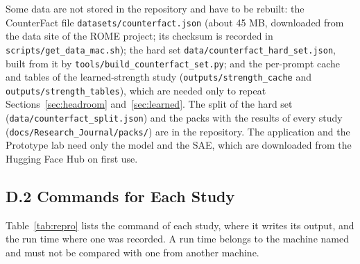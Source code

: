\documentclass[12pt,a4paper]{report}
\begin{document}
Some data are not stored in the repository and have to be rebuilt: the CounterFact file \texttt{datasets/\allowbreak{}counterfact.\allowbreak{}json} (about 45 MB, downloaded from the data site of the ROME project; its checksum is recorded in \texttt{scripts/\allowbreak{}get\_\allowbreak{}data\_\allowbreak{}mac.\allowbreak{}sh}); the hard set \texttt{data/\allowbreak{}counterfact\_\allowbreak{}hard\_\allowbreak{}set.\allowbreak{}json}, built from it by \texttt{tools/\allowbreak{}build\_\allowbreak{}counterfact\_\allowbreak{}set.\allowbreak{}py}; and the per-prompt cache and tables of the learned-strength study (\texttt{outputs/\allowbreak{}strength\_\allowbreak{}cache} and \texttt{outputs/\allowbreak{}strength\_\allowbreak{}tables}), which are needed only to repeat Sections~\ref{sec:headroom} and~\ref{sec:learned}. The split of the hard set (\texttt{data/\allowbreak{}counterfact\_\allowbreak{}split.\allowbreak{}json}) and the packs with the results of every study (\texttt{docs/\allowbreak{}Research\_\allowbreak{}Journal/\allowbreak{}packs/\allowbreak{}}) are in the repository. The application and the Prototype lab need only the model and the SAE, which are downloaded from the Hugging Face Hub on first use.

\subsection*{D.2 Commands for Each Study}
Table~\ref{tab:repro} lists the command of each study, where it writes its output, and the run time where one was recorded. A run time belongs to the machine named and must not be compared with one from another machine.
\end{document}
